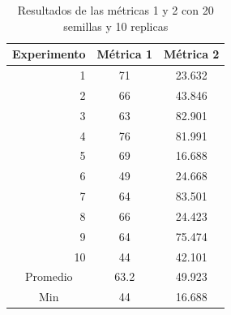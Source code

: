 \documentclass{article}
\begin{document}
\begin{center}

\begin{table}[htbp]
	\centering
	\caption{Resultados  de las métricas 1 y 2 con 20 semillas  y 10 replicas}
	\begin{tabular}{|c|c|c|}
		\hline
		Experimento  & \multicolumn{1}{l|}{Métrica 1} & \multicolumn{1}{p{6.835em}|}{Métrica 2} \\
		\hline
		\multicolumn{1}{|r|}{1} & 71    & 23.632 \\
		\hline
		\multicolumn{1}{|r|}{2} & 66    & 43.846 \\
		\hline
		\multicolumn{1}{|r|}{3} & 63    & 82.901 \\
		\hline
		\multicolumn{1}{|r|}{4} & 76    & 81.991 \\
		\hline
		\multicolumn{1}{|r|}{5} & 69    & \cellcolor[rgb]{ .663,  .816,  .557}16.688 \\
		\hline
		\multicolumn{1}{|r|}{6} & 49    & 24.668 \\
		\hline
		\multicolumn{1}{|r|}{7} & 64    & 83.501 \\
		\hline
		\multicolumn{1}{|r|}{8} & 66    & 24.423 \\
		\hline
		\multicolumn{1}{|r|}{9} & 64    & 75.474 \\
		\hline
		\multicolumn{1}{|r|}{10} & \cellcolor[rgb]{ .663,  .816,  .557}44 & 42.101 \\
		\hline
		Promedio & 63.2  & 49.923 \\
		\hline
		Min   & 44    & 16.688 \\
		\hline
	\end{tabular}%
	\label{tab:cuadro1}%
\end{table}%






\end{center}
\end{document}
